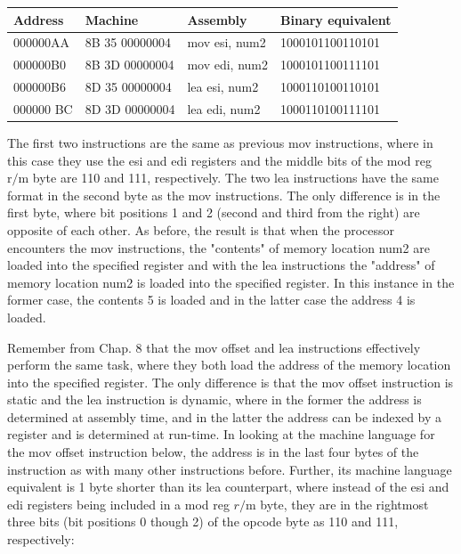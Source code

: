 \documentclass[10pt]{book}
\begin{document}
\begin{center}
\begin{center}
\begin{center}
\begin{center}
\begin{center}
\begin{center}
\begin{tabular}{|l|l|l|l|}
\hline
Address & Machine & Assembly & Binary equivalent \\
\hline
000000AA & 8B 35 00000004 & mov esi, num2 & 1000101100110101 \\
\hline
000000B0 & 8B 3D 00000004 & mov edi, num2 & 1000101100111101 \\
\hline
000000B6 & 8D 35 00000004 & lea esi, num2 & 1000110100110101 \\
\hline
000000 BC & 8D 3D 00000004 & lea edi, num2 & 1000110100111101 \\
\hline
\end{tabular}
\end{center}

The first two instructions are the same as previous mov instructions, where in this case they use the esi and edi registers and the middle bits of the mod reg $\mathrm{r} / \mathrm{m}$ byte are 110 and 111, respectively. The two lea instructions have the same format in the second byte as the mov instructions. The only difference is in the first byte, where bit positions 1 and 2 (second and third from the right) are opposite of each other. As before, the result is that when the processor encounters the mov instructions, the "contents" of memory location num2 are loaded into the specified register and with the lea instructions the "address" of memory location num2 is loaded into the specified register. In this instance in the former case, the contents 5 is loaded and in the latter case the address 4 is loaded.


Remember from Chap. 8 that the mov offset and lea instructions effectively perform the same task, where they both load the address of the memory location into the specified register. The only difference is that the mov offset instruction is static and the lea instruction is dynamic, where in the former the address is determined at assembly time, and in the latter the address can be indexed by a register and is determined at run-time. In looking at the machine language for the mov offset instruction below, the address is in the last four bytes of the instruction as with many other instructions before. Further, its machine language equivalent is 1 byte shorter than its lea counterpart, where instead of the esi and edi registers being included in a mod reg $r / \mathrm{m}$ byte, they are in the rightmost three bits (bit positions 0 though 2) of the opcode byte as 110 and 111, respectively:


\end{center}
\end{center}
\end{center}
\end{center}
\end{center}
\end{document}
